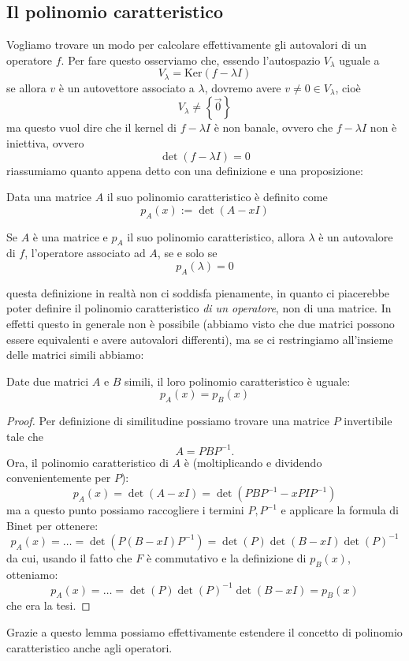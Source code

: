 \documentclass[11pt]{scrartcl}
\renewcommand{\ker}[1]{\text{Ker}\left(#1\right)}
\begin{document}
   	 \subsection{Il polinomio caratteristico}
   	 Vogliamo trovare un modo per calcolare effettivamente gli autovalori di un operatore $f$. Per fare questo osserviamo che, essendo l'autospazio $V_\lambda$ uguale a
   	 $$V_\lambda=\ker{f-\lambda I}$$
   	 se allora $v$ è un autovettore associato a $\lambda$, dovremo avere $v\ne 0\in V_\lambda$, cioè 
   	 $$V_\lambda\ne \left\{\vec{0}\right\}$$
   	 ma questo vuol dire che il kernel di $f-\lambda I $ è non banale, ovvero che $f-\lambda I $ non è iniettiva, ovvero
   	 $$\det\left(f-\lambda I\right)=0$$
   	 riassumiamo quanto appena detto con una definizione e una proposizione:
   	 \begin{definition}
   	 	Data una matrice $A$ il suo polinomio caratteristico è definito come
   	 	$$p_A(x):=\det\left(A-xI\right)$$
   	 \end{definition}
   	 \begin{proposition}
   	 	Se $A$ è una matrice e $p_A$ il suo polinomio caratteristico, allora $\lambda$ è un autovalore di $f$, l'operatore associato ad $A$, se e solo se 
   	 	$$p_A(\lambda)=0$$
   	 \end{proposition}
   	 questa definizione in realtà non ci soddisfa pienamente, in quanto ci piacerebbe poter definire il polinomio caratteristico \textit{di un operatore}, non di una matrice. In effetti questo in generale non è possibile (abbiamo visto che due matrici possono essere equivalenti e avere autovalori differenti), ma se ci restringiamo all'insieme delle matrici simili abbiamo:
   	 \begin{lemma}
   	 	Date due matrici $A$ e $B$ simili, il loro polinomio caratteristico è uguale:
   	 	$$p_A(x)=p_B(x)$$
   	 \end{lemma}
   	 \begin{proof}
   	 	Per definizione di similitudine possiamo trovare una matrice $P$ invertibile tale che 
   	 	$$A=PBP^{-1}.$$
   	 	Ora, il polinomio caratteristico di $A$ è (moltiplicando e dividendo convenientemente per $P$):
   	 	$$p_A(x)=\det\left(A-xI\right)=\det\left(PBP^{-1}-xPIP^{-1}\right)$$
   	 	ma a questo punto possiamo raccogliere i termini $P,P^{-1}$ e applicare la formula di Binet per ottenere:
   	 	$$p_A(x)=\dots=\det\left(P\left(B-xI\right)P^{-1}\right)=\det\left(P\right)\det\left(B-xI\right)\det\left(P\right)^{-1}$$
   	 	da cui, usando il fatto che $F$ è commutativo e la definizione di $p_B(x)$, otteniamo:
   	 	$$p_A(x)=\dots=\det\left(P\right)\det\left(P\right)^{-1}\det\left(B-xI\right)=p_B(x)$$
   	 	che era la tesi.
   	 \end{proof}
   	 Grazie a questo lemma possiamo effettivamente estendere il concetto di polinomio caratteristico anche agli operatori.
\end{document}

